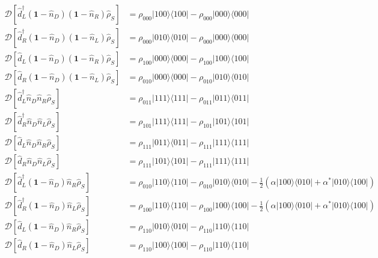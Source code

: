 \begin{appendixs}
\begin{align*}
    \mathcal{D}[\hat{d}^{\dagger}_{L}(\textbf{1}-\hat{n}_{D})(\textbf{1}-\hat{n}_{R})\hat{\rho}_{S}] & = \rho_{000}|100\rangle \langle 100| - \rho_{000}|000\rangle \langle 000| \\ 
    \mathcal{D}[\hat{d}^{\dagger}_{R}(\textbf{1}-\hat{n}_{D})(\textbf{1}-\hat{n}_{L})\hat{\rho}_{S}] & = \rho_{000}|010\rangle \langle 010| - \rho_{000}|000\rangle \langle 000| \\  
    \mathcal{D}[\hat{d}_{L}(\textbf{1}-\hat{n}_{D})(\textbf{1}-\hat{n}_{R})\hat{\rho}_{S}] & = \rho_{100}|000\rangle \langle 000| - \rho_{100}|100\rangle \langle 100|\\ 
    \mathcal{D}[\hat{d}_{R}(\textbf{1}-\hat{n}_{D})(\textbf{1}-\hat{n}_{L})\hat{\rho}_{S}] & = \rho_{010}|000\rangle \langle 000| - \rho_{010}|010\rangle \langle 010| \\ 
    \mathcal{D}[\hat{d}^{\dagger}_{L}\hat{n}_{D} \hat{n}_{R}\hat{\rho}_{S}] & = \rho_{011}|111\rangle \langle 111| - \rho_{011}|011\rangle \langle 011| \\  
    \mathcal{D}[\hat{d}^{\dagger}_{R} \hat{n}_{D}\hat{n}_{L}\hat{\rho}_{S}] & = \rho_{101}|111\rangle \langle 111| - \rho_{101}|101\rangle \langle 101| \\ 
     \mathcal{D}[\hat{d}_{L}\hat{n}_{D}\hat{n}_{R}\hat{\rho}_{S}] & = \rho_{111}|011\rangle \langle 011| - \rho_{111}|111\rangle \langle 111|  \\    
      \mathcal{D}[\hat{d}_{R}\hat{n}_{D}\hat{n}_{L}\hat{\rho}_{S}] & = \rho_{111}|101\rangle \langle 101| - \rho_{111}|111\rangle \langle 111|  \\ 
    \mathcal{D}[\hat{d}^{\dagger}_{L}(\textbf{1}-\hat{n}_{D})\hat{n}_{R}\hat{\rho}_{S}] & = \rho_{010}|110\rangle \langle 110| - \rho_{010}|010\rangle \langle 010| - \frac{1}{2}( \alpha|100\rangle \langle 010| + \alpha^{*}|010\rangle \langle 100|) \\ 
    \mathcal{D}[\hat{d}^{\dagger}_{R}(\textbf{1}-\hat{n}_{D})\hat{n}_{L}\hat{\rho}_{S}] & = \rho_{100}|110\rangle \langle 110| - \rho_{100}|100\rangle \langle 100| - \frac{1}{2}( \alpha |100\rangle \langle 010| + \alpha^{*}|010\rangle \langle 100| )  \\  
    \mathcal{D}[\hat{d}_{L}(\textbf{1}-\hat{n}_{D})\hat{n}_{R}\hat{\rho}_{S}] & = \rho_{110}|010\rangle \langle 010| - \rho_{110}|110\rangle \langle 110| \\ 
    \mathcal{D}[\hat{d}_{R}(\textbf{1}-\hat{n}_{D})\hat{n}_{L}\hat{\rho}_{S}] & = \rho_{110}|100\rangle \langle 100| - \rho_{110}|110\rangle \langle 110| \\  

\end{align*}
\end{appendixs}
